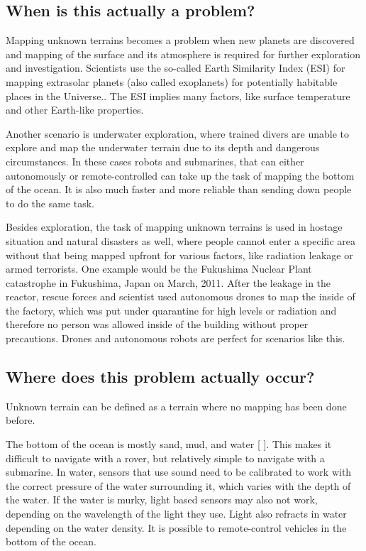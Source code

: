 \subsection{When is this actually a problem?}
Mapping unknown terrains becomes a problem when new planets are discovered and mapping of the surface and its atmosphere is required for further exploration and investigation. Scientists use the so-called Earth Similarity Index (ESI) for mapping extrasolar planets (also called exoplanets) for potentially habitable places in the Universe.\cite{exoplanets}\cite{esi}. The ESI implies many factors, like surface temperature and other Earth-like properties. 

Another scenario is underwater exploration, where trained divers are unable to explore and map the underwater terrain due to its depth and dangerous circumstances. In these cases robots and submarines, that can either autonomously or remote-controlled can take up the task of mapping the bottom of the ocean. It is also much faster and more reliable than sending down people to do the same task.

Besides exploration, the task of mapping unknown terrains is used in hostage situation and natural disasters as well, where people cannot enter a specific area without that being mapped upfront for various factors, like radiation leakage or armed terrorists. One example would be the Fukushima Nuclear Plant catastrophe in Fukushima, Japan on March, 2011. After the leakage in the reactor, rescue forces and scientist used autonomous drones to map the inside of the factory\cite{fukushima}, which was put under quarantine for high levels or radiation and therefore no person was allowed inside of the building without proper precautions. Drones and autonomous robots are perfect for scenarios like this.

\subsection{Where does this problem actually occur?}
Unknown terrain can be defined as a terrain where no mapping has been done before.

The bottom of the ocean is mostly sand, mud, and water [%
]. This makes it difficult to navigate with a rover, but relatively simple to navigate with a submarine. In water, sensors that use sound need to be calibrated to work with the correct pressure of the water surrounding it, which varies with the depth of the water. If the water is murky, light based sensors may also not work, depending on the wavelength of the light they use. Light also refracts in water depending on the water density. It is possible to remote-control vehicles in the bottom of the ocean.

